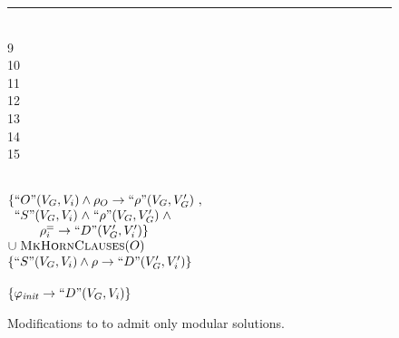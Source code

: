 \linespread{1.2}
\begin{figure}[t]
\hrule
  \centering
  \begin{minipage}[t]{.04\columnwidth}
    \mbox{}\\
    9 \\ 10 \\ 11 \\ 12\\ 13 \\ 14 \\ 15
  \end{minipage}
  \begin{minipage}[t]{.94\columnwidth}
    \mbox{}\\
    \tabTTTTT
    $
    \begin{array}[t]{@{}l}
      \set{
        \begin{array}[t]{@{}l}
          \unkOf{\StateOrig}(\GlobVars, \LocVarsOf{i}) \land \OrigRel
          \rightarrow \unkOf{\rel}(\GlobVars, \GlobVars')\ ,\\
          \begin{array}[t]{@{}l}
            \unkOf{\StateSrc}(\GlobVars, \LocVarsOf{i})
            \mathrel{\land}
            \unkOf{\rel}(\GlobVars, \GlobVars')
            \mathrel{\land}\\
            \qquad\relLocEqOf{i}
            \rightarrow \unkOf{\StateDst}(\GlobVars', \LocVarsOf{i}')}
        \end{array}
      \end{array}\\
      \mathrel{\cup} \algMkHornClauses(\StateOrig)
    \end{array}
    $ \\
    \tabTTT \algCase{$\bot$} 
    $\{\text{``}S\text{''}(V_G, V_{i})\land \rho
      \rightarrow \text{``}D\text{''}(V_G', V_{i}')\}$\\
    \tabTTT \algEnd\\
    \tabTT \algCase{$\bot$}
    $\{\varphi_{\mathit{init}} \rightarrow\text{``}D\text{''}(V_G, V_{i})\}$
  \end{minipage}
  \vspace{1ex}
  \linespread{1}
  \caption{Modifications to \algMkHornClauses to admit only modular solutions.}
  \label{fig-alg-TMMkHornClauses}
\end{figure}


